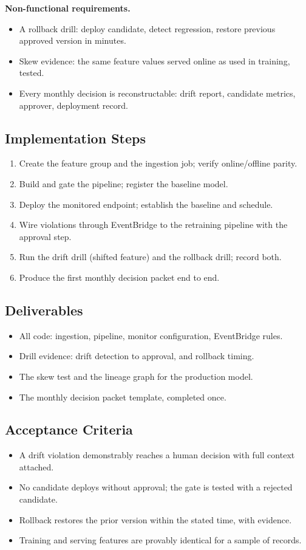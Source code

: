 \textbf{Non-functional requirements.}
\begin{itemize}
    \item A rollback drill: deploy candidate, detect regression, restore previous approved version in minutes.
    \item Skew evidence: the same feature values served online as used in training, tested.
    \item Every monthly decision is reconstructable: drift report, candidate metrics, approver, deployment record.
\end{itemize}

\subsection*{Implementation Steps}
\begin{enumerate}
    \item Create the feature group and the ingestion job; verify online/offline parity.
    \item Build and gate the pipeline; register the baseline model.
    \item Deploy the monitored endpoint; establish the baseline and schedule.
    \item Wire violations through EventBridge to the retraining pipeline with the approval step.
    \item Run the drift drill (shifted feature) and the rollback drill; record both.
    \item Produce the first monthly decision packet end to end.
\end{enumerate}

\subsection*{Deliverables}
\begin{itemize}
    \item All code: ingestion, pipeline, monitor configuration, EventBridge rules.
    \item Drill evidence: drift detection to approval, and rollback timing.
    \item The skew test and the lineage graph for the production model.
    \item The monthly decision packet template, completed once.
\end{itemize}

\subsection*{Acceptance Criteria}
\begin{itemize}
    \item A drift violation demonstrably reaches a human decision with full context attached.
    \item No candidate deploys without approval; the gate is tested with a rejected candidate.
    \item Rollback restores the prior version within the stated time, with evidence.
    \item Training and serving features are provably identical for a sample of records.
\end{itemize}

